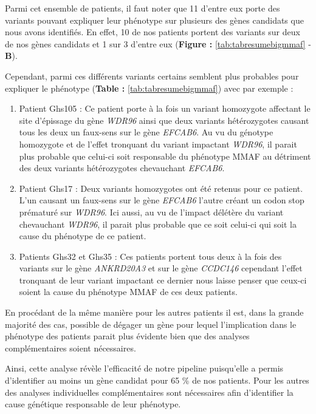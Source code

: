 \documentclass[12pt,twoside]{reedthesis}
\providecommand{\tightlist}{%
  \setlength{\itemsep}{0pt}\setlength{\parskip}{0pt}}
\theoremstyle{definition}
\theoremstyle{definition}
\theoremstyle{remark}
\begin{document}
  Parmi cet ensemble de patients, il faut noter que 11 d'entre eux porte
  des variants pouvant expliquer leur phénotype sur plusieurs des gènes
  candidats que nous avons identifiés. En effet, 10 de nos patients
  portent des variants sur deux de nos gènes candidats et 1 sur 3 d'entre
  eux (\textbf{Figure : }\ref{tab:tabresumebigmmaf} - \textbf{B}).
  
  Cependant, parmi ces différents variants certains semblent plus
  probables pour expliquer le phénotype (\textbf{Table :
  }\ref{tab:tabresumebigmmaf}) avec par exemple :
  
  \begin{enumerate}
  \def\labelenumi{\arabic{enumi}.}
  \tightlist
  \item
    Patient Ghs105 : Ce patient porte à la fois un variant homozygote
    affectant le site d'épissage du gène \emph{WDR96} ainsi que deux
    variants hétérozygotes causant tous les deux un faux-sens sur le gène
    \emph{EFCAB6}. Au vu du génotype homozygote et de l'effet tronquant du
    variant impactant \emph{WDR96}, il parait plus probable que celui-ci
    soit responsable du phénotype MMAF au détriment des deux variants
    hétérozygotes chevauchant \emph{EFCAB6}.\\
  \item
    Patient Ghs17 : Deux variants homozygotes ont été retenus pour ce
    patient. L'un causant un faux-sens sur le gène \emph{EFCAB6} l'autre
    créant un codon stop prématuré sur \emph{WDR96}. Ici aussi, au vu de
    l'impact délétère du variant chevauchant \emph{WDR96}, il parait plus
    probable que ce soit celui-ci qui soit la cause du phénotype de ce
    patient.\\
  \item
    Patients Ghs32 et Ghs35 : Ces patients portent tous deux à la fois des
    variants sur le gène \emph{ANKRD20A3} et sur le gène \emph{CCDC146}
    cependant l'effet tronquant de leur variant impactant ce dernier nous
    laisse penser que ceux-ci soient la cause du phénotype MMAF de ces
    deux patients.
  \end{enumerate}
  
  En procédant de la même manière pour les autres patients il est, dans la
  grande majorité des cas, possible de dégager un gène pour lequel
  l'implication dans le phénotype des patients parait plus évidente bien
  que des analyses complémentaires soient nécessaires.
  
  Ainsi, cette analyse révèle l'efficacité de notre pipeline puisqu'elle a
  permis d'identifier au moins un gène candidat pour 65 \% de nos
  patients. Pour les autres des analyses individuelles complémentaires
  sont nécessaires afin d'identifier la cause génétique responsable de
  leur phénotype.
  
\end{document}
